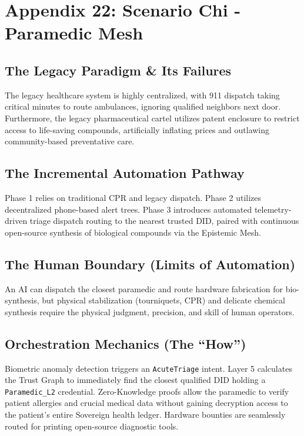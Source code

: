 \chapter{Appendix 22: Scenario Chi - Paramedic Mesh}

\section{The Legacy Paradigm \& Its Failures}
The legacy healthcare system is highly centralized, with 911 dispatch taking critical minutes to route ambulances, ignoring qualified neighbors next door. Furthermore, the legacy pharmaceutical cartel utilizes patent enclosure to restrict access to life-saving compounds, artificially inflating prices and outlawing community-based preventative care.

\section{The Incremental Automation Pathway}
Phase 1 relies on traditional CPR and legacy dispatch. Phase 2 utilizes decentralized phone-based alert trees. Phase 3 introduces automated telemetry-driven triage dispatch routing to the nearest trusted DID, paired with continuous open-source synthesis of biological compounds via the Epistemic Mesh.

\section{The Human Boundary (Limits of Automation)}
An AI can dispatch the closest paramedic and route hardware fabrication for bio-synthesis, but physical stabilization (tourniquets, CPR) and delicate chemical synthesis require the physical judgment, precision, and skill of human operators.

\section{Orchestration Mechanics (The ``How'')}
Biometric anomaly detection triggers an \texttt{AcuteTriage} intent. Layer 5 calculates the Trust Graph to immediately find the closest qualified DID holding a \texttt{Paramedic\_L2} credential. Zero-Knowledge proofs allow the paramedic to verify patient allergies and crucial medical data without gaining decryption access to the patient's entire Sovereign health ledger. Hardware bounties are seamlessly routed for printing open-source diagnostic tools.
